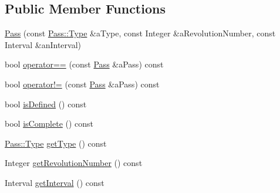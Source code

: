 \subsection*{Public Member Functions}
\begin{DoxyCompactItemize}
\item 
\hyperlink{classlibrary_1_1astro_1_1trajectory_1_1orbit_1_1_pass_a81619ec00b5929ce892bb161aa860599}{Pass} (const \hyperlink{classlibrary_1_1astro_1_1trajectory_1_1orbit_1_1_pass_aa2a63a39c759bf96a0cc62a6ed3d2ceb}{Pass\+::\+Type} \&a\+Type, const Integer \&a\+Revolution\+Number, const Interval \&an\+Interval)
\item 
bool \hyperlink{classlibrary_1_1astro_1_1trajectory_1_1orbit_1_1_pass_a65bb95b20fe63a12a0b084de4228d235}{operator==} (const \hyperlink{classlibrary_1_1astro_1_1trajectory_1_1orbit_1_1_pass}{Pass} \&a\+Pass) const
\item 
bool \hyperlink{classlibrary_1_1astro_1_1trajectory_1_1orbit_1_1_pass_a18006a7a9da3c961adabe55c7fb1cd95}{operator!=} (const \hyperlink{classlibrary_1_1astro_1_1trajectory_1_1orbit_1_1_pass}{Pass} \&a\+Pass) const
\item 
bool \hyperlink{classlibrary_1_1astro_1_1trajectory_1_1orbit_1_1_pass_ab3b061c29eea88159d5a7bcb2e83f60d}{is\+Defined} () const
\item 
bool \hyperlink{classlibrary_1_1astro_1_1trajectory_1_1orbit_1_1_pass_a14c2eb50fcafc224e1d0eb0f0ed1f2ca}{is\+Complete} () const
\item 
\hyperlink{classlibrary_1_1astro_1_1trajectory_1_1orbit_1_1_pass_aa2a63a39c759bf96a0cc62a6ed3d2ceb}{Pass\+::\+Type} \hyperlink{classlibrary_1_1astro_1_1trajectory_1_1orbit_1_1_pass_ad5484557eb68abc7561c31f605e6e171}{get\+Type} () const
\item 
Integer \hyperlink{classlibrary_1_1astro_1_1trajectory_1_1orbit_1_1_pass_a728be6c0754374ecd51fc6b6e48e0696}{get\+Revolution\+Number} () const
\item 
Interval \hyperlink{classlibrary_1_1astro_1_1trajectory_1_1orbit_1_1_pass_ab50b2d21353e444003eae95636c47994}{get\+Interval} () const
\end{DoxyCompactItemize}

